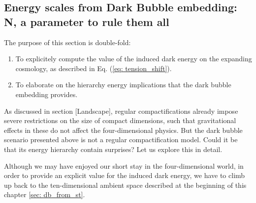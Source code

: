 \subsection{Energy scales from Dark Bubble embedding: N, a parameter to rule them all}\label{subsec: energy_scale}

The purpose of this section is double-fold:
\begin{enumerate}
    \item To explicitely compute the value of the induced dark energy on the expanding cosmology, as described in Eq. (\ref{eq: tension_shift}).
    \item To elaborate on the hierarchy energy implications that the dark bubble embedding provides.
\end{enumerate}
As discussed in section [Landscape], regular compactifications already impose severe restrictions on the size of compact dimensions, such that gravitational effects in these do not affect the four-dimensional physics. But the dark bubble scenario presented above is not a regular compactification model. Could it be that its energy hierarchy contain surprises? Let us explore this in detail.

Although we may have enjoyed our short stay in the four-dimensional world, in order to provide an explicit value for the induced dark energy, we have to climb up back to the ten-dimensional ambient space described at the beginning of this chapter \ref{sec: db_from_st}.

